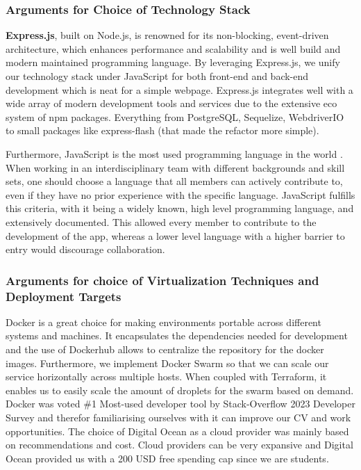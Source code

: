 \documentclass[11pt]{article}
\begin{document}
\subsubsection{Arguments for Choice of Technology Stack}
\textbf{Express.js}, built on Node.js, is renowned for its non-blocking, event-driven architecture, which enhances performance and scalability and is well build and modern maintained programming language. By leveraging Express.js, we unify our technology stack under JavaScript for both front-end and back-end development which is neat for a simple webpage. Express.js integrates well with a wide array of modern development tools and services due to the extensive eco system of npm packages. Everything from PostgreSQL, Sequelize, WebdriverIO to small packages like express-flash (that made the refactor more simple).

Furthermore, JavaScript is the most used programming language in the world \citep{javascript_good}. When working in an interdisciplinary team with different backgrounds and skill sets, one should choose a language that all members can actively contribute to, even if they have no prior experience with the specific language. JavaScript fulfills this criteria, with it being a widely known, high level programming language, and extensively documented. This allowed every member to contribute to the development of the app, whereas a lower level language with a higher barrier to entry would discourage collaboration. 


\subsubsection{Arguments for choice of Virtualization Techniques and Deployment Targets}
Docker is a great choice for making environments portable across different systems and machines. It encapsulates the dependencies needed for development and the use of Dockerhub allows to centralize the repository for the docker images. Furthermore, we implement Docker Swarm so that we can scale our service horizontally across multiple hosts. When coupled with Terraform, it enables us to easily scale the amount of droplets for the swarm based on demand. Docker was voted \#1 Most-used developer tool by Stack-Overflow 2023 Developer Survey \citep{docker_no1} and therefor familiarising ourselves with it can improve our CV and work opportunities.
The choice of Digital Ocean as a cloud provider was mainly based on recommendations and cost. Cloud providers can be very expansive and Digital Ocean provided us with a 200 USD free spending cap since we are students.
\end{document}
